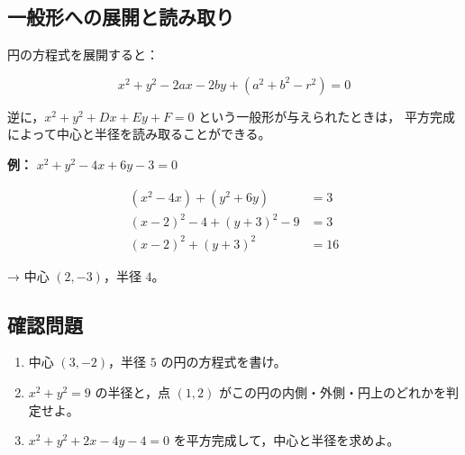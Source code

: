 \documentclass[paper=a4,fleqn]{jlreq}
\begin{document}
\subsection{一般形への展開と読み取り}

円の方程式を展開すると：

\[
  x^2 + y^2 - 2ax - 2by + (a^2 + b^2 - r^2) = 0
\]

逆に，\(x^2 + y^2 + Dx + Ey + F = 0\) という一般形が与えられたときは，
平方完成によって中心と半径を読み取ることができる。

\textbf{例：} \(x^2 + y^2 - 4x + 6y - 3 = 0\)

\begin{align*}
  (x^2 - 4x) + (y^2 + 6y) &= 3 \\
  (x-2)^2 - 4 + (y+3)^2 - 9 &= 3 \\
  (x-2)^2 + (y+3)^2 &= 16
\end{align*}

→ 中心 \((2, -3)\)，半径 \(4\)。

\subsection{確認問題}
\begin{enumerate}
  \item 中心 \((3, -2)\)，半径 \(5\) の円の方程式を書け。
  \item \(x^2 + y^2 = 9\) の半径と，点 \((1, 2)\) がこの円の内側・外側・円上のどれかを判定せよ。
  \item \(x^2 + y^2 + 2x - 4y - 4 = 0\) を平方完成して，中心と半径を求めよ。
\end{enumerate}
\end{document}
